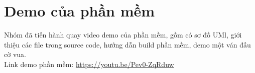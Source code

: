 \section{Demo của phần mềm}
Nhóm đã tiến hành quay video demo của phần mềm, gồm có sơ đồ UMl, giới thiệu các file trong source code, hướng dẫn build phần mềm, demo một ván đấu cờ vua.\\
Link demo phần mềm: \url{https://youtu.be/Pev0-ZqRduw}